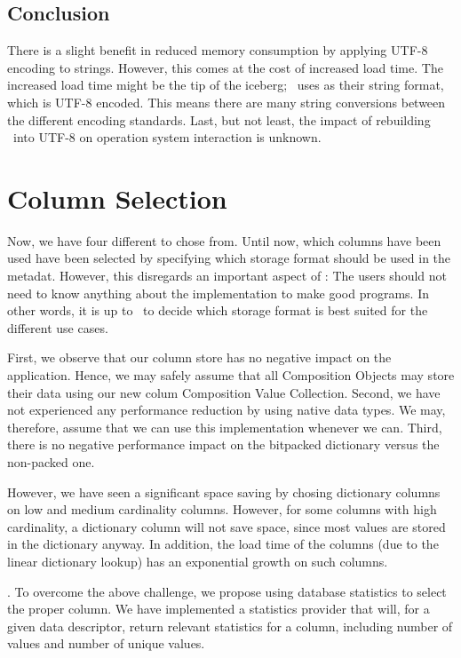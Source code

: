 \subsection{Conclusion}
\label{sub:Conclusion}
There is a slight benefit in reduced memory consumption by applying UTF-8 encoding to strings. However, this comes at the cost of increased load time. The increased load time might be the tip of the iceberg; \gap~uses  as their string format, which is UTF-8 encoded. This means there are many string conversions between the different encoding standards. Last, but not least, the impact of rebuilding  \gap~into UTF-8 on operation system interaction is unknown.

\section{Column Selection}
\label{sec:Column Selection}
Now, we have four different  to chose from. Until now, which columns have been used have been selected by specifying which storage format should be used in the metadat. However, this disregards an important aspect of \mdd: The users should not need to know anything about the implementation to make good programs. In other words, it is up to \gap~to decide which storage format is best suited for the different use cases.

First, we observe that our column store has no negative impact on the application. Hence, we may safely assume that all Composition Objects may store their data using our new colum Composition Value Collection. Second, we have not experienced any performance reduction by using native data types. We may, therefore, assume that we can use this implementation whenever we can. Third, there is no negative performance impact on the bitpacked dictionary versus the non-packed one.

However, we have seen a significant space saving by chosing dictionary columns on low and medium cardinality columns. However, for some columns with high cardinality, a dictionary column will not save space, since most values are stored in the dictionary anyway. In addition, the load time of the columns (due to the linear dictionary lookup) has an exponential growth on such columns.

.
To overcome the above challenge, we propose using database statistics to select the proper column. We have implemented a statistics provider that will, for a given data descriptor, return relevant statistics for a column, including number of values and number of unique values.

